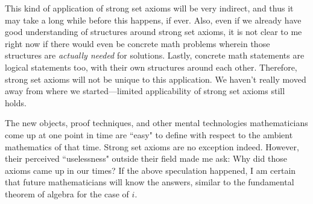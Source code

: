 \documentclass{article}
\theoremstyle{plain}
\begin{document}
This kind of application of strong set axioms will be very indirect, and thus it may take a long while before this happens, if ever. Also, even if we already have good understanding of structures around strong set axioms, it is not clear to me right now if there would even be concrete math problems wherein those structures are \textit{actually needed} for solutions. Lastly, concrete math statements are logical statements too, with their own structures around each other. Therefore, strong set axioms will not be unique to this application. We haven't really moved away from where we started---limited applicability of strong set axioms still holds.

The new objects, proof techniques, and other mental technologies mathematicians come up at one point in time are ``easy" to define with respect to the ambient mathematics of that time. Strong set axioms are no exception indeed. However, their perceived ``uselessness" outside their field made me ask: Why did those axioms came up in our times? If the above speculation happened, I am certain that future mathematicians will know the answers, similar to the fundamental theorem of algebra for the case of $i$.



\end{document}

